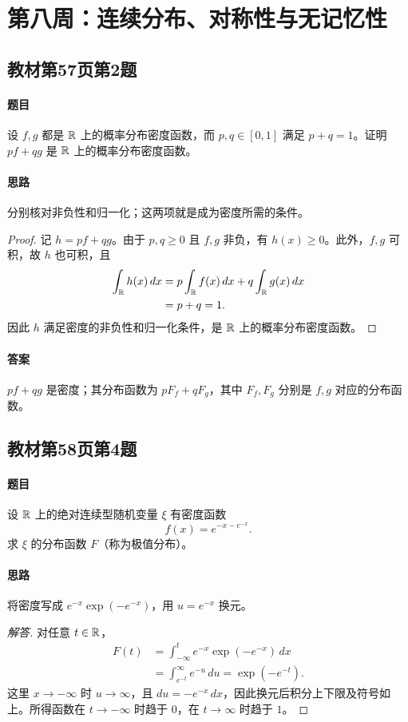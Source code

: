 \section{第八周：连续分布、对称性与无记忆性}

\subsection{教材第57页第2题}\label{ex:w08-b57-2}
\paragraph{题目}
设 $f,g$ 都是 $\mathbb R$ 上的概率分布密度函数，而 $p,q\in[0,1]$ 满足 $p+q=1$。证明 $pf+qg$ 是 $\mathbb R$ 上的概率分布密度函数。
\paragraph{思路} 分别核对非负性和归一化；这两项就是成为密度所需的条件。
\begin{proof}
记 $h=pf+qg$。由于 $p,q\geq0$ 且 $f,g$ 非负，有 $h(x)\geq0$。此外，$f,g$ 可积，故 $h$ 也可积，且
\begin{align*}
\int_{\mathbb R}h(x)\,dx
&=p\int_{\mathbb R}f(x)\,dx+q\int_{\mathbb R}g(x)\,dx\\
&=p+q=1.
\end{align*}
因此 $h$ 满足密度的非负性和归一化条件，是 $\mathbb R$ 上的概率分布密度函数。
\end{proof}
\paragraph{答案} $pf+qg$ 是密度；其分布函数为 $pF_f+qF_g$，其中 $F_f,F_g$ 分别是 $f,g$ 对应的分布函数。

\subsection{教材第58页第4题}\label{ex:w08-b58-4}
\paragraph{题目}
设 $\mathbb R$ 上的绝对连续型随机变量 $\xi$ 有密度函数
\[
f(x)=e^{-x-e^{-x}}.
\]
求 $\xi$ 的分布函数 $F$（称为极值分布）。
\paragraph{思路} 将密度写成 $e^{-x}\exp(-e^{-x})$，用 $u=e^{-x}$ 换元。
\begin{proof}[解答]
对任意 $t\in\mathbb R$，
\begin{align*}
F(t)
&=\int_{-\infty}^t e^{-x}\exp(-e^{-x})\,dx\\
&=\int_{e^{-t}}^{\infty}e^{-u}\,du
=\exp(-e^{-t}).
\end{align*}
这里 $x\to-\infty$ 时 $u\to\infty$，且 $du=-e^{-x}\,dx$，因此换元后积分上下限及符号如上。所得函数在 $t\to-\infty$ 时趋于 $0$，在 $t\to\infty$ 时趋于 $1$。
\end{proof}
